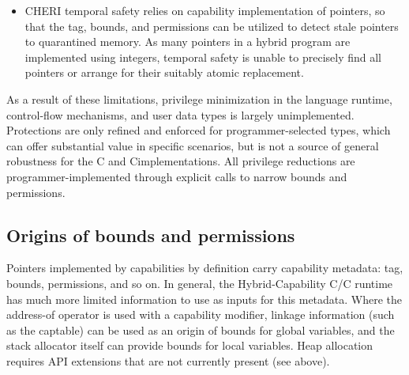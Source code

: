 \documentclass[12pt,twoside,openright,a4paper]{article}
\newcommand{\note}[2]{{\color{blue}[ Note: #1 - #2]}}
\renewcommand{\note}[2]{\relax\ifhmode\unskip\fi}
\newcommand{\psnote}[1]{\note{#1}{Peter S.}}
\newcommand{\nwfnote}[1]{\note{#1}{nwf}}
\newcommand{\dcnote}[1]{\note{#1}{David}}
\newcommand*{\cpp}{\texorpdfstring{C\textsmaller[2]{\protect\nolinebreak[4]\hspace{-.05em}\raisebox{.45ex}{\textbf{++}}}}{C++}}
\newcommand*{\COrCpp}{C/\cpp{}}
\newcommand*{\hybridCOrCpp}{Hybrid-Capability \COrCpp{}}
\begin{document}
\begin{itemize}
\item CHERI temporal safety relies on capability implementation of pointers,
  so that the tag, bounds, and permissions can be utilized to detect stale
  pointers to quarantined memory.
  As many pointers in a hybrid program are implemented using integers,
  temporal safety is unable to precisely find all pointers or arrange for
  their suitably atomic replacement.
  \dcnote{I think I'd phrase this slightly differently.  From the perspective
    of revocation, DDC (which encompases the C heap, stack, and image), is a
    single object and so no object reachable from the hybrid heap / stack /
    globals will ever be revoked.}
  \nwfnote{Well, a capability held within DDC that points to a revokable IPC
    object (i.e., an object not within DDC) is still subject to revocation
    as per usual.  I'd phrase it as ``subobjects of DDC'' will not be revoked
    soundly even if revocation is attempted.  In a sense DDC and the
    VMMAP-bearing caps handed to malloc are analogous here: malloc would be
    free (hah) to reconstruct a pointer to a free/revoked region incorrectly,
    but we (endeavour to) ensure that it doesn't.}
\end{itemize}

As a result of these limitations, privilege minimization in the language
runtime, control-flow mechanisms, and user data types is largely unimplemented.
Protections are only refined and enforced for programmer-selected types, which
can offer substantial value in specific scenarios, but is not a source of
general robustness for the C and \cpp implementations.
All privilege reductions are programmer-implemented through explicit calls to
narrow bounds and permissions.

\subsection{Origins of bounds and permissions}

Pointers implemented by capabilities by definition carry capability metadata:
tag, bounds, permissions, and so on.
In general, the \hybridCOrCpp{} runtime has much more limited information to
use as inputs for this metadata.
\psnote{...than pure-capability CHERI C/C++ (hmm -- maybe it's worth still keeping the ``pure'' terminology for this document, to make such oppositions clear?)}
Where the address-of operator is used with a capability modifier, linkage
information (such as the captable) can be used as an origin of bounds for
global variables, and the stack allocator itself can provide bounds for local
variables.
Heap allocation requires API extensions that are not currently present (see
above).
\end{document}
